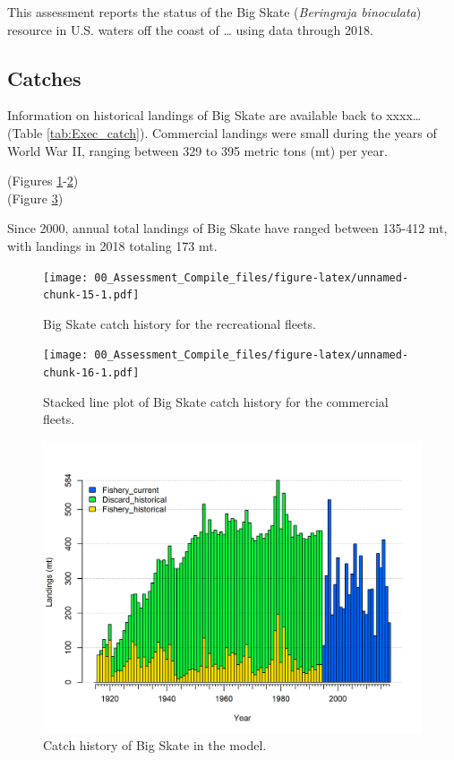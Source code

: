 \documentclass[12pt,]{article}
\begin{document}
This assessment reports the status of the Big Skate
(\emph{Beringraja binoculata}) resource in U.S. waters off the coast of
\ldots{} using data through 2018.

\hypertarget{catches}{%
\subsection*{Catches}\label{catches}}

Information on historical landings of Big Skate are available back to
xxxx\ldots{} (Table \ref{tab:Exec_catch}). Commercial landings were
small during the years of World War II, ranging between 329 to 395
metric tons (mt) per year.

(Figures \ref{fig:Exec_catch1}-\ref{fig:Exec_catch2})\\
(Figure \ref{fig:r4ss_catches})

Since 2000, annual total landings of Big Skate have ranged between
135-412 mt, with landings in 2018 totaling 173 mt.

\FloatBarrier

\begin{figure}
\centering
\texttt{[image: 00\_Assessment\_Compile\_files/figure-latex/unnamed-chunk-15-1.pdf]}
\caption{Big Skate catch history for the recreational fleets.
\label{fig:Exec_catch1}}
\end{figure}

\begin{figure}
\centering
\texttt{[image: 00\_Assessment\_Compile\_files/figure-latex/unnamed-chunk-16-1.pdf]}
\caption{Stacked line plot of Big Skate catch history for the commercial
fleets. \label{fig:Exec_catch2}}
\end{figure}

\FloatBarrier

\begin{figure}
\centering
\includegraphics{r4ss/plots_mod1/catch2 landings stacked.png}
\caption{Catch history of Big Skate in the model.
\label{fig:r4ss_catches}}
\end{figure}
\end{document}
